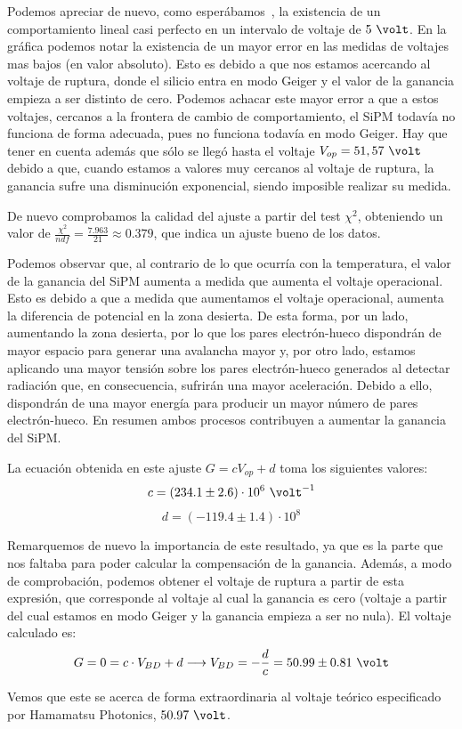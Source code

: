 \begin{itemize}
Podemos apreciar de nuevo, como esperábamos~\cite{tesisSiPM}, la existencia de un comportamiento  lineal casi perfecto en un intervalo de voltaje de $5~\volt$. En la gráfica podemos notar la existencia de un mayor error en las medidas de voltajes mas bajos (en valor absoluto). Esto es debido a que nos estamos acercando al voltaje de ruptura, donde el silicio entra en modo Geiger y el valor de la ganancia empieza a ser distinto de cero. Podemos achacar este mayor error a que a estos voltajes, cercanos a la frontera de cambio de comportamiento, el SiPM todavía no funciona de forma adecuada,  pues no funciona todavía en  modo Geiger. Hay que tener en cuenta además que sólo se llegó hasta el voltaje $V_{op}=51,57~\volt$  debido a que, cuando estamos a valores muy cercanos al voltaje de ruptura,  la ganancia sufre una disminución exponencial, siendo imposible realizar su medida.

De nuevo comprobamos la calidad del ajuste a partir del test $\chi^2$, obteniendo un valor de $\frac{\chi^2}{ndf}=\frac{7.963}{21}\approx 0.379$, que indica un ajuste bueno de los datos.

Podemos observar que, al contrario de lo que ocurría con la temperatura, el valor de la ganancia del SiPM aumenta a medida que aumenta el voltaje operacional. Esto es debido a que a medida que aumentamos el voltaje operacional, aumenta la diferencia de potencial en la zona desierta. De esta forma, por un lado, aumentando la zona desierta, por lo que los pares electrón-hueco dispondrán de mayor espacio para generar una avalancha mayor  y, por otro lado, estamos aplicando una mayor tensión sobre los pares electrón-hueco generados al detectar radiación que,  en consecuencia, sufrirán una mayor aceleración. Debido a ello, dispondrán de una mayor energía para producir un mayor número de pares electrón-hueco. En resumen ambos procesos contribuyen a aumentar la ganancia del SiPM.

La ecuación obtenida en este ajuste $G=cV_{op}+d$ toma los siguientes valores: 
\begin{equation}
c=(234.1 \pm 2.6) \cdot 10^6~\volt^{-1}
\label{ajustependientevoltaje}
\end{equation}
\begin{equation}
d=(-119.4 \pm 1.4) \cdot 10^8
\label{ajusteordenadavoltaje}
\end{equation}

Remarquemos de nuevo la importancia de este resultado, ya que es la parte que nos faltaba para poder calcular la compensación de la ganancia.
Además, a modo de comprobación, podemos obtener el voltaje de ruptura a partir de esta expresión, que corresponde al voltaje al cual la ganancia es cero (voltaje a partir del cual estamos en modo Geiger y la ganancia empieza a ser no nula). El voltaje calculado es: 
\begin{equation}
G=0=c \cdot V_{BD} +d \longrightarrow V_{BD}=-\frac{d}{c}=50.99 \pm 0.81~\volt
\label{ajustebdv}
\end{equation}

Vemos que este se acerca de forma extraordinaria al voltaje teórico especificado por Hamamatsu Photonics, $50.97~\volt$.
\end{itemize}